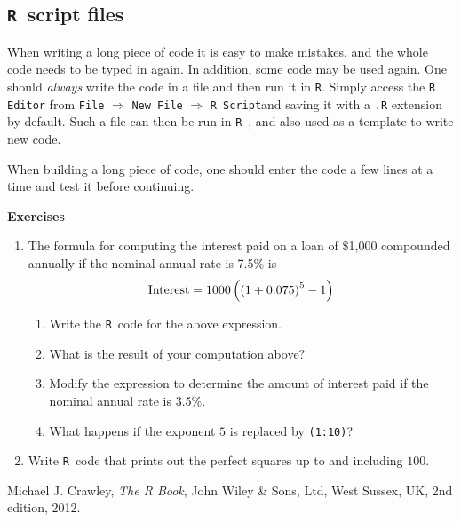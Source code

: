 \documentclass[12pt,A4,makeidx]{article}\usepackage[]{graphicx}\usepackage[]{xcolor}
\newcommand{\tR}{\texttt{R}}
\begin{document}
\subsection{\tR\ script files}

When writing a long piece of code it is easy to make mistakes, and the whole code needs to be typed in again. In addition, some code may be used again. 
One should {\it always} write the code in a file and then run it in
\tR. Simply access the \texttt{R Editor} from 
\texttt{File} $\Rightarrow$ \texttt{New File} $\Rightarrow$ \texttt{R Script}and saving it with a \texttt{.R} extension by default. Such a file can then be 
run in \tR\ , and also used as a template to write new code. 

When building a long piece of code, one should enter the code a few lines at a time and test it before continuing.

{\bf Exercises}
\begin{enumerate}
\item The formula for computing the interest paid  on a loan of
\$1,000 compounded annually if the nominal annual rate is 7.5\% is
$${\rm Interest} = 1000\left(\left(1+0.075\right)^5-1\right)$$
\begin{enumerate}
\item Write the \tR \ code for the above expression.
\item What is the result of your computation above?
\item Modify the expression to determine the amount of interest paid if the nominal annual rate is 3.5\%.
\item What happens if the exponent $5$ is replaced by \texttt{(1:10)}?
\end{enumerate}
\item Write  \tR \ code that prints out the perfect squares up to and including $100$.
\end{enumerate}


\begin{thebibliography}{9}
Michael J. Crawley,
  \textit{The R Book},
  John Wiley \& Sons, Ltd, West Sussex, UK,
  2nd edition,
  2012.
\end{thebibliography}
\end{document}
